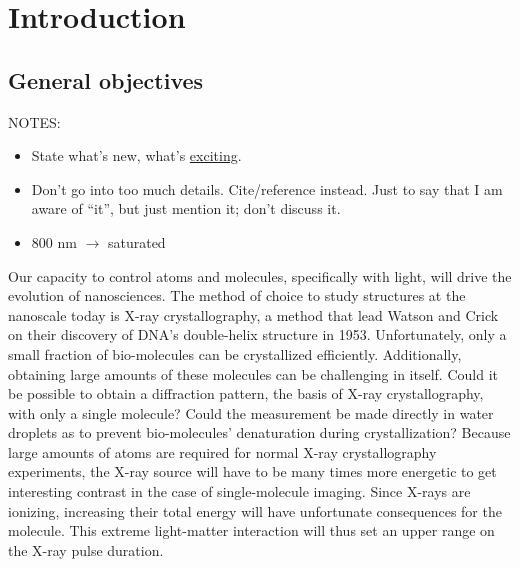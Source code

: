 \section{Introduction}


\subsection{General objectives}


NOTES:
\begin{itemize}
\item State what's new, what's \underline{exciting}.
\item Don't go into too much details. Cite/reference instead. Just to say that
I am aware of ``it'', but just mention it; don't discuss it.
\item 800 nm $\rightarrow$ saturated
\end{itemize}

Our capacity to control atoms and molecules, specifically with light,
will drive the evolution of nanosciences. The method of choice to study
structures at the nanoscale today is X-ray crystallography, a method that lead
Watson and Crick on their discovery of DNA's double-helix structure in 1953.
Unfortunately, only a small fraction of bio-molecules can be crystallized
efficiently\citeneeded. Additionally, obtaining large amounts of these
molecules can be challenging in itself\cite{Young2010}. Could it be
possible to obtain a diffraction pattern,
the basis of X-ray crystallography, with only a single  molecule? Could the
measurement be made directly in water droplets as to prevent bio-molecules'
denaturation during crystallization? Because large amounts of atoms are
required for normal X-ray crystallography experiments, the X-ray source will
have to be many times more energetic to get interesting contrast in the
case of single-molecule imaging. Since X-rays are ionizing, increasing their
total energy will have unfortunate consequences for the molecule. This
extreme light-matter interaction will thus set an upper range on the X-ray
pulse duration.


